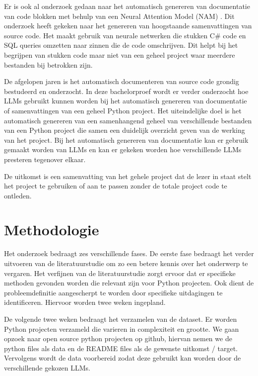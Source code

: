 Er is ook al onderzoek gedaan naar het automatisch genereren van documentatie van code blokken met behulp van een Neural Attention Model (NAM) \autocite{IyerEtAl2016}.
Dit onderzoek heeft gekeken naar het genereren van hoogstaande samenvattingen van source code. 
Het maakt gebruik van neurale netwerken die stukken C\# code en SQL queries omzetten naar zinnen die de code omschrijven. 
Dit helpt bij het begrijpen van stukken code maar niet van een geheel project waar meerdere bestanden bij betrokken zijn.

De afgelopen jaren is het automatisch documenteren van source code grondig bestudeerd en onderzocht.
In deze bachelorproef wordt er verder onderzocht hoe LLMs gebruikt kunnen worden bij het automatisch genereren van documentatie of samenvattingen van een geheel Python project.
Het uiteindelijke doel is het automatisch genereren van een samenhangend geheel van verschillende bestanden van een Python project die samen een duidelijk overzicht geven van de werking van het project.
Bij het automatisch genereren van documentatie kan er gebruik gemaakt worden van LLMs en kan er gekeken worden hoe verschillende LLMs presteren tegenover elkaar. 

De uitkomst is een samenvatting van het gehele project dat de lezer in staat stelt het project te gebruiken of aan te passen zonder de totale project code te ontleden.

\section{Methodologie}%
\label{sec:methodologie}

Het onderzoek bedraagt zes verschillende fases. 
De eerste fase bedraagt het verder uitvoeren van de literatuurstudie om zo een betere kennis over het onderwerp te vergaren.
Het verfijnen van de literatuurstudie zorgt ervoor dat er specifieke methoden gevonden worden die relevant zijn voor Python projecten.
Ook dient de probleemdefinitie aangescherpt te worden door specifieke uitdagingen te identificeren.
Hiervoor worden twee weken ingepland.

De volgende twee weken bedraagt het verzamelen van de dataset. Er worden Python projecten verzameld die varieren in complexiteit en grootte.
We gaan opzoek naar open source python projecten op github, hiervan nemen we de python files als data en de README files als de gewenste uitkomst / target.
Vervolgens wordt de data voorbereid zodat deze gebruikt kan worden door de verschillende gekozen LLMs.

